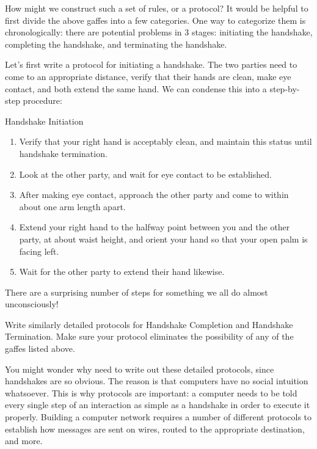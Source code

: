 How might we construct such a set of rules, or a protocol? It would be helpful to first divide the above gaffes into a few categories. One way to categorize them is chronologically: there are potential problems in 3 stages: initiating the handshake, completing the handshake, and terminating the handshake.

Let's first write a protocol for initiating a handshake. The two parties need to come to an appropriate distance, verify that their hands are clean, make eye contact, and both extend the same hand. We can condense this into a step-by-step procedure:

\begin{graybox}
{\Large Handshake Initiation}
\begin{enumerate}
    \item Verify that your right hand is acceptably clean, and maintain this status until handshake termination.
    \item Look at the other party, and wait for eye contact to be established.
    \item After making eye contact, approach the other party and come to within about one arm length apart.
    \item Extend your right hand to the halfway point between you and the other party, at about waist height, and orient your hand so that your open palm is facing left.
    \item Wait for the other party to extend their hand likewise.
\end{enumerate}
\end{graybox}

There are a surprising number of steps for something we all do almost unconsciously! 

\begin{exercise}
    Write similarly detailed protocols for Handshake Completion and Handshake Termination. Make sure your protocol eliminates the possibility of any of the gaffes listed above.
\end{exercise}

You might wonder why need to write out these detailed protocols, since handshakes are so obvious. The reason is that computers have no social intuition whatsoever. This is why protocols are important: a computer needs to be told every single step of an interaction as simple as a handshake in order to execute it properly. Building a computer network requires a number of different protocols to establish how messages are sent on wires, routed to the appropriate destination, and more.

